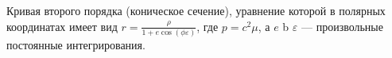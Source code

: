 Кривая второго порядка (коническое сечение), уравнение которой в полярных координатах имеет вид $r=\frac{\rho}{1+e\cos(\phi\varepsilon)}$, где $p=c^2\mu$, а $e$ b $\varepsilon$ --- произвольные постоянные интегрирования.
